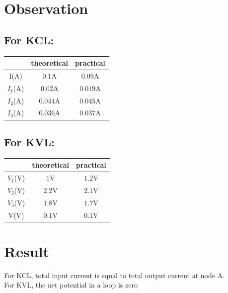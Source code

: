 \documentclass[a4paper,12pt]{article}
\begin{document}
\section{Observation}
\subsection{For KCL: }
\begin{table}[h]
  \centering
  \begin{tabular}{|c|c|c|}
    \hline
    \textbf{} & \textbf{theoretical} & \textbf{practical} \\
    \hline
    I(A) &  $0.1\text{A}$ &  $0.09\text{A}$ \\
    $I_1$(A) &  $0.02\text{A}$ &  $0.019\text{A}$ \\
    $I_2$(A) &  $0.044\text{A}$ &  $0.045\text{A}$ \\
    $I_3$(A) &  $0.036\text{A}$ &  $0.037\text{A}$ \\
    \hline
  \end{tabular}
\end{table}
\subsection{For KVL: }
\begin{table}[h]
  \centering
  \begin{tabular}{|c|c|c|}
    \hline
    \textbf{} & \textbf{theoretical} & \textbf{practical} \\
    \hline
    $V_1$(V) &  $1\text{V}$ &  $1.2\text{V}$ \\
    $V_2$(V) &  $2.2\text{V}$ &  $2.1\text{V}$ \\
    $V_3$(V) &  $1.8\text{V}$ &  $1.7\text{V}$ \\
    V(V) &  $0.1\text{V}$ &  $0.1\text{V}$ \\
    \hline
  \end{tabular}
\end{table}

\section{Result}
For KCL, total input current is equal to total output current at node A.  \\
For KVL, the net potential in a loop is zero
\end{document}

